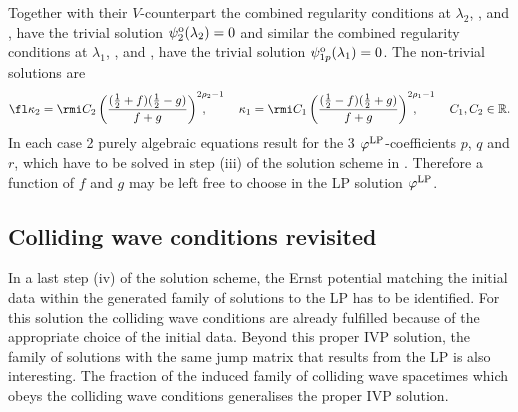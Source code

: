 \documentclass[12pt]{iopart}
\begin{document}
Together with their $V$-counterpart the combined regularity conditions at $\lambda_2$, ,  and , have the trivial solution $\psi_2^{\rm o}(\lambda_2)=0$ and similar the combined regularity conditions at $\lambda_1$, ,  and , have the trivial solution $\psi_{1p}^{\rm o}(\lambda_1)=0$. The non-trivial solutions are
\begin{eqnarray}
\fl\kappa_2=\rmi C_2\left(\frac{(\frac12+f)(\frac12-g)}{f+g}\right)^{2\rho_2-1}
\hspace{-0.7cm},\hspace{.9cm}
\kappa_1=\rmi C_1\left(\frac{(\frac12-f)(\frac12+g)}{f+g}\right)^{2\rho_1-1}
\hspace{-0.7cm},\hspace{.9cm}
 C_1,C_2\in\mathbb{R}. \label{kappa12}
\end{eqnarray}
In each case 2 purely algebraic equations result for the 3 $\varphi^{\rm LP}$-coefficients $p$, $q$ and $r$, which have to be solved in step (iii) of the solution scheme in . Therefore a function of $f$ and $g$ may be left free to choose in the LP solution $\varphi^{\rm LP}$.



\subsection{Colliding wave conditions revisited}%

In a last step (iv) of the solution scheme, the Ernst potential matching the initial data within the generated family of solutions to the LP  has to be identified. For this solution the colliding wave conditions  are already fulfilled because of the appropriate choice of the initial data. Beyond this proper IVP solution, the family of solutions with the same jump matrix that results from the LP is also interesting. The fraction of the induced family of colliding wave spacetimes which obeys the colliding wave conditions generalises the proper IVP solution. 
\end{document}
